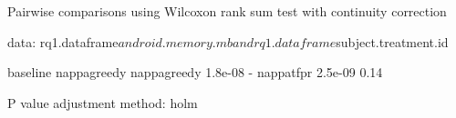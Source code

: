 
	Pairwise comparisons using Wilcoxon rank sum test with continuity correction 

data:  rq1.dataframe$android.memory.mb and rq1.dataframe$subject.treatment.id 

            baseline nappagreedy
nappagreedy 1.8e-08  -          
nappatfpr   2.5e-09  0.14       

P value adjustment method: holm 
